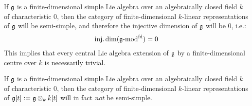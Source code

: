         \begin{example}
            If $\mathfrak{g}$ is a finite-dimensional simple Lie algebra over an algebraically closed field $k$ of characteristic $0$, then the category of finite-dimensional $k$-linear representations of $\mathfrak{g}$ will be semi-simple, and therefore the injective dimension of $\mathfrak{g}$ will be $0$, i.e.:
                $$\operatorname{inj.dim}(\mathfrak{g}\text{-}\mathrm{mod}^{\mathrm{fd}}) = 0$$
            This implies that every central Lie algebra extension of $\mathfrak{g}$ by a finite-dimensional centre over $k$ is necessarily trivial. 
        \end{example}
        \begin{example}
            If $\mathfrak{g}$ is a finite-dimensional simple Lie algebra over an algebraically closed field $k$ of characteristic $0$, then the category of finite-dimensional $k$-linear representations of $\g[t] := \g \tensor_k k[t]$ will in fact \textit{not} be semi-simple. 
        \end{example}

